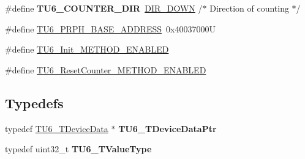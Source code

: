 \begin{DoxyCompactItemize}
\item 
\hypertarget{group___t_u6__module_ga6555d98b38f86dfaf50d6e6d89182b87}{\#define {\bfseries T\-U6\-\_\-\-C\-O\-U\-N\-T\-E\-R\-\_\-\-D\-I\-R}~\hyperlink{group___p_e___types__module_gga89181fe4df1c4701239176768b4a9ce5ab1bf68da897d09488069dd40e54f442d}{D\-I\-R\-\_\-\-D\-O\-W\-N}    /$\ast$ Direction of counting $\ast$/}\label{group___t_u6__module_ga6555d98b38f86dfaf50d6e6d89182b87}

\item 
\#define \hyperlink{group___t_u6__module_ga9fe72a60299286f25e7456150c46a85f}{T\-U6\-\_\-\-P\-R\-P\-H\-\_\-\-B\-A\-S\-E\-\_\-\-A\-D\-D\-R\-E\-S\-S}~0x40037000\-U
\item 
\#define \hyperlink{group___t_u6__module_ga9bde74f996b7d5141160e1fcaee5de5e}{T\-U6\-\_\-\-Init\-\_\-\-M\-E\-T\-H\-O\-D\-\_\-\-E\-N\-A\-B\-L\-E\-D}
\item 
\#define \hyperlink{group___t_u6__module_ga1b394143e13e8b213faa6670c66a0430}{T\-U6\-\_\-\-Reset\-Counter\-\_\-\-M\-E\-T\-H\-O\-D\-\_\-\-E\-N\-A\-B\-L\-E\-D}
\end{DoxyCompactItemize}
\subsection*{Typedefs}
\begin{DoxyCompactItemize}
\item 
\hypertarget{group___t_u6__module_ga69b812821e310f9575c95eec4b7bb247}{typedef \hyperlink{struct_t_u6___t_device_data}{T\-U6\-\_\-\-T\-Device\-Data} $\ast$ {\bfseries T\-U6\-\_\-\-T\-Device\-Data\-Ptr}}\label{group___t_u6__module_ga69b812821e310f9575c95eec4b7bb247}

\item 
\hypertarget{group___t_u6__module_ga434ff840ce5f5d217d235ad9fc732d16}{typedef uint32\-\_\-t {\bfseries T\-U6\-\_\-\-T\-Value\-Type}}\label{group___t_u6__module_ga434ff840ce5f5d217d235ad9fc732d16}

\end{DoxyCompactItemize}
